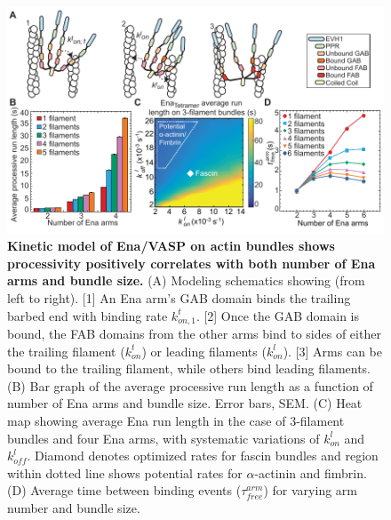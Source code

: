 \begin{figure}
\centering
\includegraphics[width=\textwidth]{img/ch02/Figure_5_elife.pdf}
\caption[Kinetic model of Ena/VASP on actin bundles shows processivity positively correlates with both number of Ena arms and bundle size.]{\textbf{Kinetic model of Ena/VASP on actin bundles shows processivity positively correlates with both number of Ena arms and bundle size.} (A) Modeling schematics showing (from left to right). [1] An Ena arm's GAB domain binds the trailing barbed end with binding rate $k^{t}_{on,1}$. [2] Once the GAB domain is bound, the FAB domains from the other arms bind to sides of either the trailing filament ($k^{t}_{on}$) or leading filaments ($k^{l}_{on}$). [3] Arms can be bound to the trailing filament, while others bind leading filaments. (B) Bar graph of the average processive run length as a function of number of Ena arms and bundle size. Error bars, SEM. (C) Heat map showing average Ena run length in the case of 3-filament bundles and four Ena arms, with systematic variations of $k^{l}_{on}$ and $k^{l}_{off}$. Diamond denotes optimized rates for fascin bundles and region within dotted line shows potential rates for $\alpha$-actinin and fimbrin. (D) Average time between binding events ($\tau_{free}^{arm}$) for varying arm number and bundle size.}
\label{fig:ena-model}
\end{figure}

